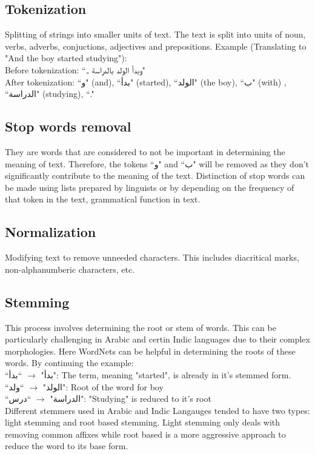 \documentclass{article}
\begin{document}
\subsection{Tokenization}
Splitting of strings into smaller units of text. The text is split into units of noun, verbs, adverbs, conjuctions, adjectives and prepositions.
Example (Translating to "And the boy started studying"): \\
Before tokenization: ``\textarabic{وبدأ الولد بالدراسة ۔}" \\
After tokenization:
``\textarabic{و}" (and), ``\textarabic{بدأ}" (started), ``\textarabic{الولد}" (the boy), ``\textarabic{ب}" (with) , ``\textarabic{الدراسة}" (studying), ``."

\subsection{Stop words removal}
They are words that are considered to not be important in determining the meaning of text. Therefore, the tokens ``\textarabic{و}" and ``\textarabic{ب}" will be removed as they don't significantly contribute to the meaning of the text. Distinction of stop words can be made using lists prepared by linguists or by depending on the frequency of that token in the text, grammatical function in text.
\subsection{Normalization}
Modifying text to remove unneeded characters. This includes diacritical marks, non-alphanumberic characters, etc. 
\subsection{Stemming}
This process involves determining the root or stem of words. This can be particularly challenging in Arabic and certin Indic languages due to their complex morphologies. Here WordNets can be helpful in determining the roots of these words.
By continuing the example: \\
``\textarabic{بدأ}" $\rightarrow$ ``\textarabic{بدأ}": The term, meaning "started", is already in it's stemmed form. \\
``\textarabic{الولد}" $\rightarrow$ ``\textarabic{ولد}": Root of the word for boy \\
``\textarabic{الدراسة}" $\rightarrow$ 
``\textarabic{درس}": "Studying" is reduced to it's root \\
Different stemmers used in Arabic and Indic Langauges tended to have two types: light stemming and root based stemming. Light stemming only deals with removing common affixes while root based is a more aggressive approach to reduce the word to its base form.
\end{document}
